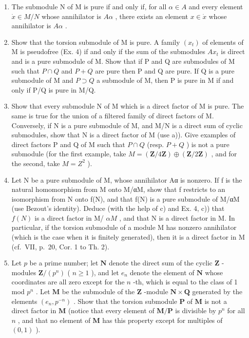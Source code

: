 \begin{enumerate}
\def\labelenumi{\alph{enumi})}
\item
  The submodule N of M is pure if and only if, for all \(\alpha \in A\) and every element \(\dot{x} \in M/N\) whose annihilator is \(A\alpha\) , there exists an element \(x \in \dot{x}\) whose annihilator is \(A\alpha\) .
\item
  Show that the torsion submodule of M is pure. A family \((x_{t})\) of elements of M is pseudofree (Ex. 4) if and only if the sum of the submodules \(Ax_{t}\) is direct and is a pure submodule of M. Show that if P and Q are submodules of M such that \(P \cap Q\) and \(P + Q\) are pure then P and Q are pure. If Q is a pure submodule of M and \(P \supset Q\) a submodule of M, then P is pure in M if and only if P/Q is pure in M/Q.
\item
  Show that every submodule N of M which is a direct factor of M is pure. The same is true for the union of a filtered family of direct factors of M. Conversely, if N is a pure submodule of M, and M/N is a direct sum of cyclic submodules, show that N is a direct factor of M (use a)). Give examples of direct factors P and Q of M such that \(P \cap Q\) (resp. \(P + Q\) ) is not a pure submodule (for the first example, take \(M = (\mathbf{Z}/4\mathbf{Z}) \oplus (\mathbf{Z}/2\mathbf{Z})\) , and for the second, take \(M = Z^{2}\) ).
\item
  Let N be a pure submodule of M, whose annihilator Aα is nonzero. If f is the natural homomorphism from M onto M/αM, show that f restricts to an isomorphism from N onto f(N), and that f(N) is a pure submodule of M/αM (use Bezout's identity). Deduce (with the help of c) and Ex. 4, c)) that \(f(N)\) is a direct factor in M/ \(\alpha M\) , and that N is a direct factor in M. In particular, if the torsion submodule of a module M has nonzero annihilator (which is the case when it is finitely generated), then it is a direct factor in M (cf.~VII, p.~20, Cor. 1 to Th. 2).
\item
  Let \(p\) be a prime number; let \(\mathbf{N}\) denote the direct sum of the cyclic \(\mathbf{Z}\) -modules \(\mathbf{Z} / (p^n)\) ( \(n \geqslant 1\) ), and let \(e_n\) denote the element of \(\mathbf{N}\) whose coordinates are all zero except for the \(n\) -th, which is equal to the class of 1 mod \(p^n\) . Let \(\mathbf{M}\) be the submodule of the \(\mathbf{Z}\) -module \(\mathbf{N} \times \mathbf{Q}\) generated by the elements \((e_n, p^{-n})\) . Show that the torsion submodule \(\mathbf{P}\) of \(\mathbf{M}\) is not a direct factor in \(\mathbf{M}\) (notice that every element of \(\mathbf{M} / \mathbf{P}\) is divisible by \(p^n\) for all \(n\) , and that no element of \(\mathbf{M}\) has this property except for multiples of \((0, 1)\) ).
\end{enumerate}


